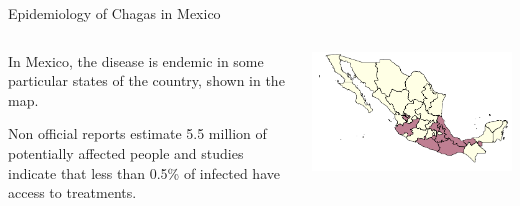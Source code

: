 \documentclass{beamer}
\begin{document}
\begin{frame}{Epidemiology of Chagas in Mexico}
	\begin{columns}
		\begin{column}{0.3\textwidth}
		
			In Mexico, the disease is endemic in some particular states of the country, shown in the map.
			
			
			\medskip Non official reports estimate 5.5 million of potentially affected people and studies indicate that less than 0.5\% of infected have access to treatments. 

		\end{column}
		\begin{column}{0.7\textwidth}
			\includegraphics[width=\textwidth]{slides/Ambientes_Gran_Chaco-Mexico_original.png}
		\end{column}
	\end{columns}
\end{frame}
\end{document}
